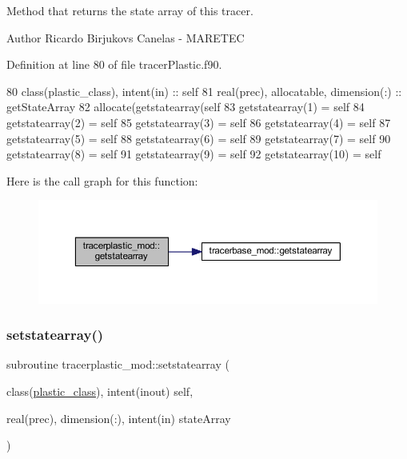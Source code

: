 Method that returns the state array of this tracer. 

\begin{DoxyAuthor}{Author}
Ricardo Birjukovs Canelas -\/ M\+A\+R\+E\+T\+EC 
\end{DoxyAuthor}


Definition at line 80 of file tracer\+Plastic.\+f90.


\begin{DoxyCode}
80     \textcolor{keywordtype}{class}(plastic\_class), \textcolor{keywordtype}{intent(in)} :: self
81     \textcolor{keywordtype}{real(prec)}, \textcolor{keywordtype}{allocatable}, \textcolor{keywordtype}{dimension(:)} :: getStateArray
82     \textcolor{keyword}{allocate}(getstatearray(self%
83     getstatearray(1) = self%
84     getstatearray(2) = self%
85     getstatearray(3) = self%
86     getstatearray(4) = self%
87     getstatearray(5) = self%
88     getstatearray(6) = self%
89     getstatearray(7) = self%
90     getstatearray(8) = self%
91     getstatearray(9) = self%
92     getstatearray(10) = self%
\end{DoxyCode}
Here is the call graph for this function\+:\nopagebreak
\begin{figure}[H]
\begin{center}
\leavevmode
\includegraphics[width=350pt]{namespacetracerplastic__mod_aa8cdd2196261b216dd6cdd5b7ef2fe90_cgraph}
\end{center}
\end{figure}
\mbox{\label{namespacetracerplastic__mod_a5e5bd350455400938950d2129c1f4980}} 
\subsubsection{\texorpdfstring{setstatearray()}{setstatearray()}}
{\footnotesize\ttfamily subroutine tracerplastic\+\_\+mod\+::setstatearray (\begin{DoxyParamCaption}\item[{class(\mbox{\hyperlink{structtracerplastic__mod_1_1plastic__class}{plastic\+\_\+class}}), intent(inout)}]{self,  }\item[{real(prec), dimension(\+:), intent(in)}]{state\+Array }\end{DoxyParamCaption})\hspace{0.3cm}{\ttfamily [private]}}



